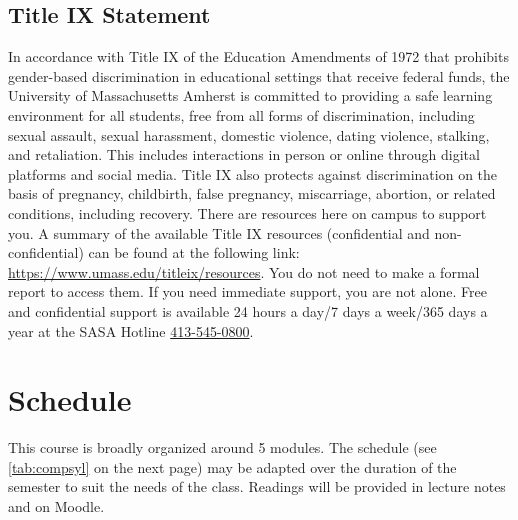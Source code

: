 \documentclass[11pt,twoside]{article}
\numberwithin{equation}{section}
\newcommand{\?}{\stackrel{?}{=}}
\begin{document}
\subsection{Title IX Statement}
In accordance with Title IX of the Education Amendments of 1972 that prohibits gender-based discrimination in
educational settings that receive federal funds, the University of Massachusetts Amherst is committed to
providing a safe learning environment for all students, free from all forms of discrimination, including
sexual assault, sexual harassment, domestic violence, dating violence, stalking, and retaliation. This
includes interactions in person or online through digital platforms and social media. Title IX also protects
against discrimination on the basis of pregnancy, childbirth, false pregnancy, miscarriage, abortion, or
related conditions, including recovery. There are resources here on campus to support you. A summary of the
available Title IX resources (confidential and non-confidential) can be found at the following link:
\url{https://www.umass.edu/titleix/resources}. You do not need to make a formal report to access them. If you need
immediate support, you are not alone. Free and confidential support is available 24 hours a day/7 days a
week/365 days a year at the SASA Hotline \href{tel:4135450800}{413-545-0800}.

\section{Schedule}
This course is broadly organized around 5 modules. The schedule (see \autoref{tab:compsyl} on the next page) may be adapted over the duration of the semester to suit the needs of the class.
Readings will be provided in lecture notes and on Moodle.

\end{document}

